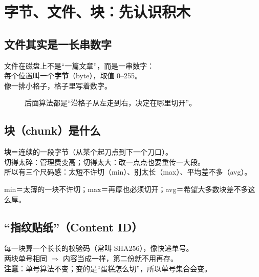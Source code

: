 \chapter{字节、文件、块：先认识积木}
\label{ch:N-byte}

\section{文件其实是一长串数字}

文件在磁盘上不是``一篇文章''，而是一串数字：\\
每个位置叫一个\textbf{字节}（byte），取值 0--255。\\
像一排小格子，格子里写着数字。

\begin{figure}[htbp]
\centering
{}
\caption{后面算法都是``沿格子从左走到右，决定在哪里切开''。}
\label{fig:N-bytes}
\end{figure}

\section{块（chunk）是什么}

\textbf{块}＝连续的一段字节（从某个起刀点到下一个刀口）。\\
切得太碎：管理费变高；切得太大：改一点点也要重传一大段。\\
所以有三个尺码感：太短不许切（min）、别太长（max）、平均差不多（avg）。

\begin{metaphor}[切蛋糕]
min＝太薄的一块不许切；max＝再厚也必须切开；avg＝希望大多数块差不多这么厚。
\end{metaphor}

\section{``指纹贴纸''（Content ID）}

每一块算一个长长的校验码（常叫 SHA256），像快递单号。\\
两块单号相同 $\Rightarrow$ 内容当成一样，第二份就不用再存。\\
\textbf{注意}：单号算法不变；变的是``蛋糕怎么切''，所以单号集合会变。

